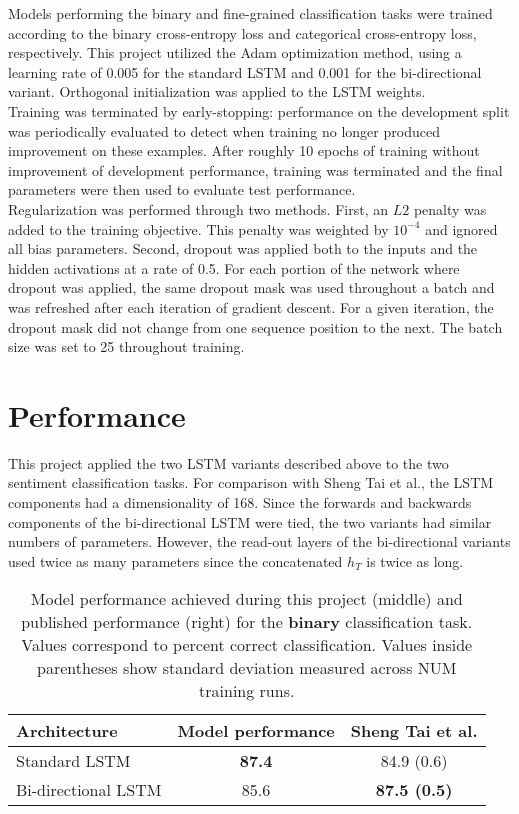 \documentclass[a4paper]{article}
\begin{document}
Models performing the binary and fine-grained classification tasks were trained according to the binary cross-entropy loss and categorical cross-entropy loss, respectively. This project utilized the Adam optimization method, using a learning rate of 0.005 for the standard LSTM and 0.001 for the bi-directional variant. Orthogonal initialization was applied to the LSTM weights.\\
Training was terminated by early-stopping: performance on the development split was periodically evaluated to detect when training no longer produced improvement on these examples. After roughly 10 epochs of training without improvement of development performance, training was terminated and the final parameters were then used to evaluate test performance.\\
Regularization was performed through two methods. First, an $L2$ penalty was added to the training objective. This penalty was weighted by $10^{-4}$ and ignored all bias parameters. Second, dropout was applied both to the inputs and the hidden activations at a rate of 0.5. For each portion of the network where dropout was applied, the same dropout mask was used throughout a batch and was refreshed after each iteration of gradient descent. For a given iteration, the dropout mask did not change from one sequence position to the next. The batch size was set to 25 throughout training.

\section{Performance}

This project applied the two LSTM variants described above to the two sentiment classification tasks. For comparison with Sheng Tai et al., the LSTM components had a dimensionality of 168. Since the forwards and backwards components of the bi-directional LSTM were tied, the two variants had similar numbers of parameters. However, the read-out layers of the bi-directional variants used twice as many parameters since the concatenated $h_T$ is twice as long.\\


\begin{table}
\centering
\begin{tabular}{l|c|c}
Architecture & Model performance & Sheng Tai et al. \\\hline
Standard LSTM & \textbf{87.4} & 84.9 (0.6) \\
Bi-directional LSTM & 85.6 & \textbf{87.5 (0.5)}
\end{tabular}
\caption{\label{tab:binary}Model performance achieved during this project (middle) and published performance (right) for the \textbf{binary} classification task. Values correspond to percent correct classification. Values inside parentheses show standard deviation measured across NUM training runs.}
\end{table}
\end{document}
